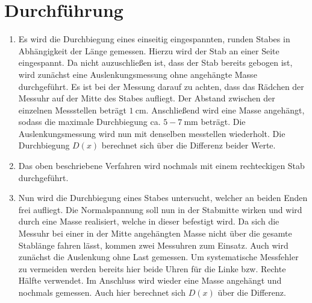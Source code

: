 
\section{Durchführung}
\label{sec:Durchführung}

\renewcommand{\labelenumi}{\alph{enumi})}
\begin{enumerate}
  \item Es wird die Durchbiegung eines einseitig eingespannten, runden Stabes in
   Abhängigkeit der Länge gemessen. Hierzu wird der Stab an einer Seite eingespannt.
   Da nicht auzuschließen ist, dass der Stab bereits gebogen ist, wird zunächst
    eine Auslenkungsmessung ohne angehängte Masse durchgeführt. Es ist bei der
     Messung darauf zu achten, dass das Rädchen der Messuhr auf der Mitte des Stabes aufliegt.
     Der Abstand zwischen der einzelnen Messstellen beträgt
     $\SI{1}{\centi\meter}$. Anschließend wird eine Masse angehängt, sodass
      die maximale Durchbiegung ca. $5-\SI{7}{\milli\meter}$ beträgt. Die Auslenkungsmessung
       wird nun mit denselben messtellen wiederholt. Die Durchbiegung $D(x)$
       berechnet sich über die Differenz beider Werte.

       \item Das oben beschriebene Verfahren wird nochmals mit einem
        rechteckigen Stab durchgeführt.

        \item Nun wird die Durchbiegung eines Stabes untersucht, welcher an beiden Enden frei aufliegt.
         Die Normalspannung soll nun in der Stabmitte wirken und wird durch eine
          Masse realisiert, welche in dieser befestigt wird.
          Da sich die Messuhr bei einer in der Mitte angehängten Masse nicht
           über die gesamte Stablänge fahren lässt, kommen zwei Messuhren zum Einsatz.
           Auch wird zunächst die Auslenkung ohne Last gemessen.
            Um systematische Messfehler zu vermeiden werden bereits hier
             beide Uhren für die Linke bzw. Rechte Hälfte verwendet. Im Anschluss
              wird wieder eine Masse angehängt und nochmals gemessen. Auch hier
               berechnet sich $D(x)$ über die Differenz.

\end{enumerate}

